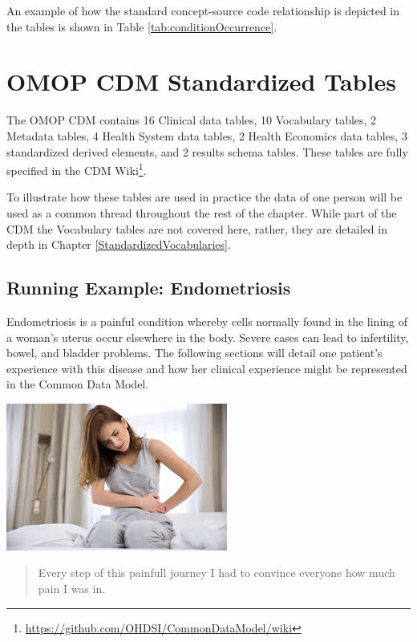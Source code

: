 \documentclass[11pt]{book}
\let\rmarkdownfootnote\footnote%
\def\footnote{\protect\rmarkdownfootnote}
\theoremstyle{definition}
\theoremstyle{definition}
\theoremstyle{definition}
\theoremstyle{remark}
\begin{document}
An example of how the standard concept-source code relationship is depicted in the tables is shown in Table \ref{tab:conditionOccurrence}.

\hypertarget{omop-cdm-standardized-tables}{%
\section{OMOP CDM Standardized Tables}\label{omop-cdm-standardized-tables}}

The OMOP CDM contains 16 Clinical data tables, 10 Vocabulary tables, 2 Metadata tables, 4 Health System data tables, 2 Health Economics data tables, 3 standardized derived elements, and 2 results schema tables. These tables are fully specified in the CDM Wiki\footnote{\url{https://github.com/OHDSI/CommonDataModel/wiki}}.

To illustrate how these tables are used in practice the data of one person will be used as a common thread throughout the rest of the chapter. While part of the CDM the Vocabulary tables are not covered here, rather, they are detailed in depth in Chapter \ref{StandardizedVocabularies}.

\hypertarget{running-example-endometriosis}{%
\subsection{Running Example: Endometriosis}\label{running-example-endometriosis}}

Endometriosis is a painful condition whereby cells normally found in the lining of a woman's uterus occur elsewhere in the body. Severe cases can lead to infertility, bowel, and bladder problems. The following sections will detail one patient's experience with this disease and how her clinical experience might be represented in the Common Data Model.

\begin{center}\includegraphics[width=0.5\linewidth]{images/CommonDataModel/Lauren} \end{center}

\begin{quote}
Every step of this painfull journey I had to convince everyone how much pain I was in.
\end{quote}
\end{document}
